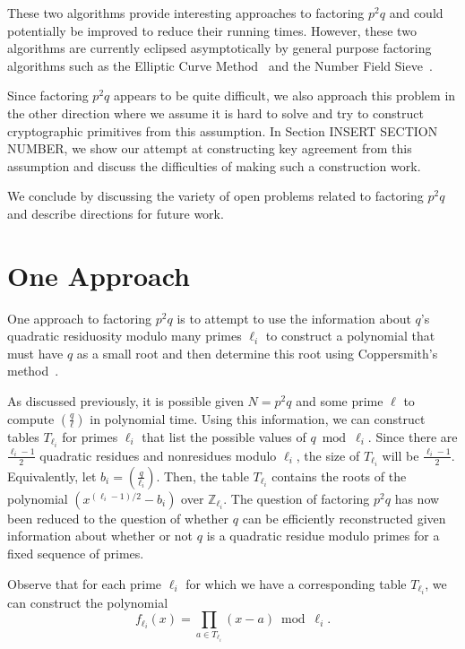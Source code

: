 \documentclass[letterpaper,twocolumn,10pt]{article}
\begin{document}
These two algorithms provide interesting approaches to factoring $p^2 q$ and could potentially be improved to reduce their running times. However, these two algorithms are currently eclipsed asymptotically by general purpose factoring algorithms such as the Elliptic Curve Method~\cite{Lenstra} and the Number Field Sieve~\cite{pomerance}.  

Since factoring $p^2 q$ appears to be quite difficult, we also approach this problem in the other direction where we assume it is hard to solve and try to construct cryptographic primitives from this assumption. In Section {\color{red} INSERT SECTION NUMBER}, we show our attempt at constructing key agreement from this assumption and discuss the difficulties of making such a construction work. 

We conclude by discussing the variety of open problems related to factoring $p^2 q$ and describe directions for future work.




\section{One Approach}


One approach to factoring $p^2 q$ is to attempt to use the information about $q$'s quadratic residuosity modulo many primes $\ell_i$ to construct a polynomial that must have $q$ as a small root and then determine this root using Coppersmith's method~\cite{Coppersmith}. 

As discussed previously, it is possible given $N = p^2 q$ and some prime $\ell$ to compute $\left(\frac{q}{\ell}\right)$ in polynomial time. Using this information, we can construct tables $T_{\ell_i}$ for primes $\ell_i$ that list the possible values of $q \bmod \ell_i$. Since there are $\frac{\ell_i - 1}{2}$ quadratic residues and nonresidues modulo $\ell_i$, the size of $T_{\ell_i}$ will be $\frac{\ell_i - 1}{2}$. Equivalently, let $b_i =  \left(\frac{q}{\ell_i}\right)$. Then, the table $T_{\ell_i}$ contains the roots of the polynomial $(x^{(\ell_i - 1)/2} - b_i)$ over $\mathbb{Z}_{\ell_i}$. The question of factoring $p^2 q$ has now been reduced to the question of whether $q$ can be efficiently reconstructed given information about whether or not $q$ is a quadratic residue modulo primes for a fixed sequence of primes. 

Observe that for each prime $\ell_i$ for which we have a corresponding table $T_{\ell_i}$, we can construct the polynomial
\[
f_{\ell_i}(x) = \prod_{a \in T_{\ell_i}} (x - a) \bmod \ell_i.
\]
\end{document}
